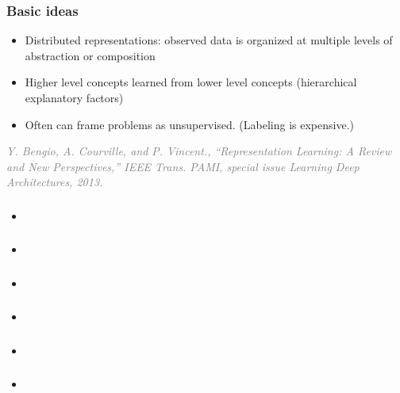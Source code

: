 \documentclass{beamer}
\newcommand\smallgray[1]{\textcolor{gray}{\small\it #1}}
\newcommand\prevwork[1]{\smallgray{#1}}
\begin{document}
\begin{frame}
  \frametitle{Basic ideas}
  \begin{itemize}
  \item Distributed representations: observed data is organized at
    multiple levels of abstraction or composition
  \item Higher level concepts learned from lower level concepts
    (hierarchical explanatory factors)
  \item Often can frame problems as unsupervised.  (Labeling is
    expensive.)
  \end{itemize}
  
  \prevwork{Y. Bengio, A. Courville, and P. Vincent., ``Representation
    Learning: A Review and New Perspectives,'' IEEE Trans. PAMI,
    special issue Learning Deep Architectures, 2013.}
\end{frame}

\begin{frame}
  \frametitle{}
  \begin{itemize}
  \item 
  \end{itemize}
\end{frame}

\begin{frame}
  \frametitle{}
  \begin{itemize}
  \item 
  \end{itemize}
\end{frame}

\begin{frame}
  \frametitle{}
  \begin{itemize}
  \item 
  \end{itemize}
\end{frame}

\begin{frame}
  \frametitle{}
  \begin{itemize}
  \item 
  \end{itemize}
\end{frame}

\begin{frame}
  \frametitle{}
  \begin{itemize}
  \item 
  \end{itemize}
\end{frame}

\begin{frame}
  \frametitle{}
  \begin{itemize}
  \item 
  \end{itemize}
\end{frame}
\end{document}
